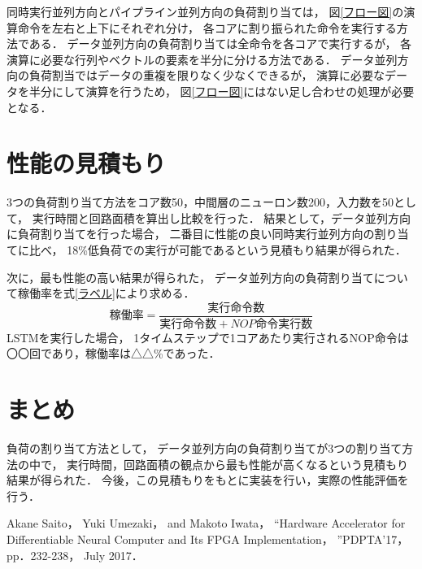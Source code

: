 \documentclass[a4j]{jarticle}
\begin{document}
\begin{Abstract}
同時実行並列方向とパイプライン並列方向の負荷割り当ては，
図\ref{フロー図}の演算命令を左右と上下にそれぞれ分け，
各コアに割り振られた命令を実行する方法である．
データ並列方向の負荷割り当ては全命令を各コアで実行するが，
各演算に必要な行列やベクトルの要素を半分に分ける方法である．
データ並列方向の負荷割当ではデータの重複を限りなく少なくできるが，
演算に必要なデータを半分にして演算を行うため，
図\ref{フロー図}にはない足し合わせの処理が必要となる．


 \section{性能の見積もり}
 3つの負荷割り当て方法をコア数50，中間層のニューロン数200，入力数を50として，
 実行時間と回路面積を算出し比較を行った．
 結果として，データ並列方向に負荷割り当てを行った場合，
 二番目に性能の良い同時実行並列方向の割り当てに比べ，
 18\%低負荷での実行が可能であるという見積もり結果が得られた．

次に，最も性能の高い結果が得られた，
データ並列方向の負荷割り当てについて稼働率を式\ref{ラベル}により求める．
\begin{equation}
  稼働率 = \frac{実行命令数}{実行命令数+NOP命令実行数}
  \label{ラベル}
\end{equation}
LSTMを実行した場合，
1タイムステップで1コアあたり実行されるNOP命令は〇〇回であり，稼働率は△△\%であった．

 \section{まとめ}
負荷の割り当て方法として，
データ並列方向の負荷割り当てが3つの割り当て方法の中で，
実行時間，回路面積の観点から最も性能が高くなるという見積もり結果が得られた．
今後，この見積もりをもとに実装を行い，実際の性能評価を行う．


\begin{thebibliography}{99}
  Akane Saito， Yuki Umezaki， and Makoto Iwata，
  ``Hardware Accelerator for Differentiable Neural Computer and Its FPGA Implementation，
  ''PDPTA'17， pp．232-238， July 2017．
\end{thebibliography}

\end{Abstract}
\end{document}
